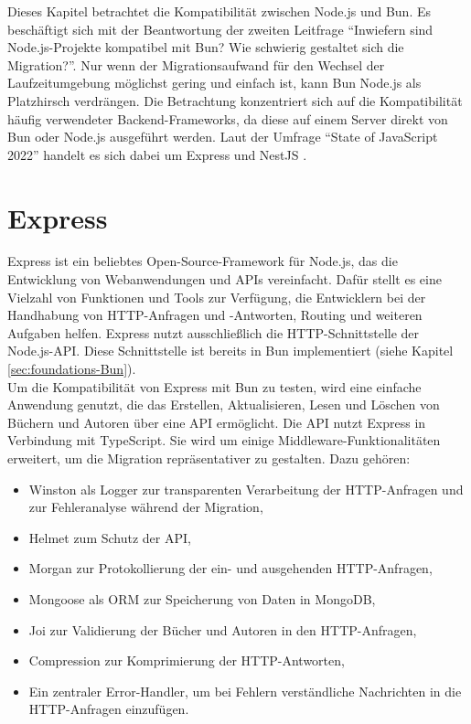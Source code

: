   \label{compabitility}
Dieses Kapitel betrachtet die Kompatibilität zwischen Node.js und Bun. Es beschäftigt sich mit der Beantwortung der zweiten Leitfrage ``Inwiefern sind Node.js-Projekte kompatibel mit Bun? Wie schwierig gestaltet sich die Migration?''. Nur wenn der Migrationsaufwand für den Wechsel der Laufzeitumgebung möglichst gering und einfach ist, kann Bun Node.js als Platzhirsch verdrängen. Die Betrachtung konzentriert sich auf die Kompatibilität häufig verwendeter Backend-Frameworks, da diese auf einem Server direkt von Bun oder Node.js ausgeführt werden. Laut der Umfrage ``State of JavaScript 2022'' handelt es sich dabei um Express und NestJS \cite{Greif.2022}.

\section{Express} \label{sec:compabitility-newProjects}
Express ist ein beliebtes Open-Source-Framework für Node.js, das die Entwicklung von Webanwendungen und APIs vereinfacht. Dafür stellt es eine Vielzahl von Funktionen und Tools zur Verfügung, die Entwicklern bei der Handhabung von HTTP-Anfragen und -Antworten, Routing und weiteren Aufgaben helfen. Express nutzt ausschließlich die HTTP-Schnittstelle der Node.js-API. Diese Schnittstelle ist bereits in Bun implementiert (siehe Kapitel \ref{sec:foundations-Bun}).\\

\noindent 
Um die Kompatibilität von Express mit Bun zu testen, wird eine einfache Anwendung genutzt, die das Erstellen, Aktualisieren, Lesen und Löschen von Büchern und Autoren über eine API ermöglicht. Die API nutzt Express in Verbindung mit TypeScript. Sie wird um einige Middleware-Funktionalitäten erweitert, um die Migration repräsentativer zu gestalten. Dazu gehören:
\begin{itemize}
	\item Winston als Logger zur transparenten Verarbeitung der HTTP-Anfragen und zur Fehleranalyse während der Migration,
	\item Helmet zum Schutz der API,
	\item Morgan zur Protokollierung der ein- und ausgehenden HTTP-Anfragen,
	\item Mongoose als ORM zur Speicherung von Daten in MongoDB, 
	\item Joi zur Validierung der Bücher und Autoren in den HTTP-Anfragen,
	\item Compression zur Komprimierung der HTTP-Antworten,
	\item Ein zentraler Error-Handler, um bei Fehlern verständliche Nachrichten in die HTTP-Anfragen einzufügen.
\end{itemize}
	
